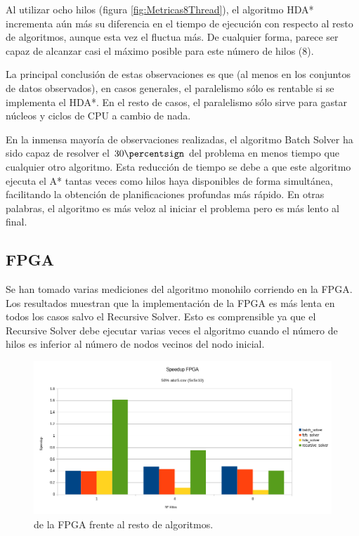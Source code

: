 Al utilizar ocho hilos (figura \ref{fig:Metricas8Thread}),
el algoritmo HDA* incrementa aún más su diferencia
en el tiempo de ejecución con respecto al resto de algoritmos,
aunque esta vez el  fluctua más.
De cualquier forma, parece ser capaz de alcanzar casi
el máximo  posible para este número de hilos (8).

La principal conclusión de estas observaciones es que
(al menos en los conjuntos de datos observados),
en casos generales,
el paralelismo sólo es rentable si se implementa el HDA*.
En el resto de casos, el paralelismo sólo sirve para
gastar núcleos y ciclos de CPU a cambio de nada.

\begin{notebox}
    En la inmensa mayoría de observaciones realizadas,
    el algoritmo Batch Solver
    ha sido capaz de resolver el $30\percentsign$ del problema
    en menos tiempo que cualquier otro algoritmo.
    Esta reducción de tiempo se debe a que este algoritmo ejecuta el A*
    tantas veces como hilos haya disponibles de forma simultánea,
    facilitando la obtención de planificaciones profundas más rápido. 
    En otras palabras, el algoritmo es más veloz al iniciar el problema
    pero es más lento al final.
\end{notebox}

\pagebreak
\subsection{FPGA}

Se han tomado varias mediciones del algoritmo monohilo corriendo en la FPGA.
Los resultados muestran que la implementación de la FPGA es más lenta
en todos los casos salvo el Recursive Solver.
Esto es comprensible ya que el Recursive Solver debe ejecutar varias
veces el algoritmo cuando el número de hilos es inferior al
número de nodos vecinos del nodo inicial.

\begin{figure}[h]
    \begin{center}
        \includegraphics[width=\textwidth]{Media/Ch2/Speedup_FPGA.png}
        \caption{ de la FPGA frente al resto de algoritmos.}
        \label{fig:SpeedupFPGA}
    \end{center}
\end{figure}

